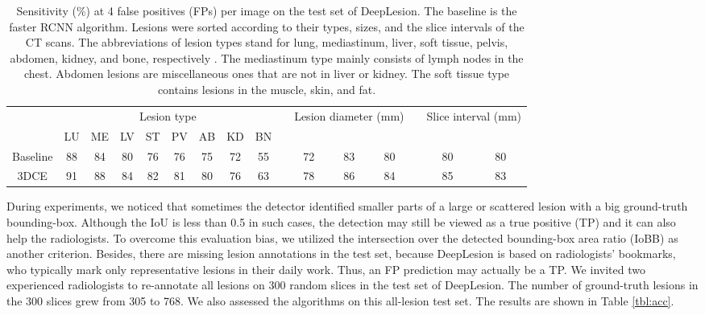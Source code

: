 \documentclass[a4paper]{llncs}
\def\Tbl#1{{Table \ref{tbl:#1}}}
\begin{document}
\begin{table}[]
	\centering
	\scriptsize	
	\setlength{\tabcolsep}{2.7pt}
	\renewcommand{\arraystretch}{1.2}
	\caption{Sensitivity (\%) at 4 false positives (FPs) per image on the test set of DeepLesion. The baseline is the faster RCNN algorithm. Lesions were sorted according to their types, sizes, and the slice intervals of the CT scans. The abbreviations of lesion types stand for lung, mediastinum, liver, soft tissue, pelvis, abdomen, kidney, and bone, respectively \cite{Yan2018DeepLes}. The mediastinum type mainly consists of lymph nodes in the chest. Abdomen lesions are miscellaneous ones that are not in liver or kidney. The soft tissue type contains lesions in the muscle, skin, and fat.}
	\begin{tabular}{cccccccccccccccc} 

		\hline 
		&	\multicolumn{8}{c}{Lesion type} && \multicolumn{3}{c}{Lesion diameter (mm)} && \multicolumn{2}{c}{Slice interval (mm)} \\
		
		&	LU	&	ME	&	LV	&	ST	&	PV	&	AB	&	KD	&	BN	&&		&		&		&& 	&		\\
		\hline
		Baseline &	88	&	84	&	80	&	76	&	76	&	75	&	72	&	55	&&	72	&	83	&	80	&&	80	&	80	\\
		3DCE	&	91	&	88	&	84	&	82	&	81	&	80	&	76	&	63	&&	78	&	86	&	84	&&	85	&	83	\\			
		
		\hline
	\end{tabular}

	\label{tbl:cls}
\end{table}

During experiments, we noticed that sometimes the detector identified smaller parts of a large or scattered lesion with a big ground-truth bounding-box. Although the IoU is less than 0.5 in such cases, the detection may still be viewed as a true positive (TP) and it can also help the radiologists. To overcome this evaluation bias, we utilized the intersection over the detected bounding-box area ratio (IoBB) as another criterion. Besides, there are missing lesion annotations in the test set, because DeepLesion is based on radiologists' bookmarks, who typically mark only representative lesions in their daily work. Thus, an FP prediction may actually be a TP. We invited two experienced radiologists to re-annotate all lesions on 300 random slices in the test set of DeepLesion. The number of ground-truth lesions in the 300 slices grew from 305 to 768. We also assessed the algorithms on this all-lesion test set. The results are shown in \Tbl{acc}.
\end{document}

